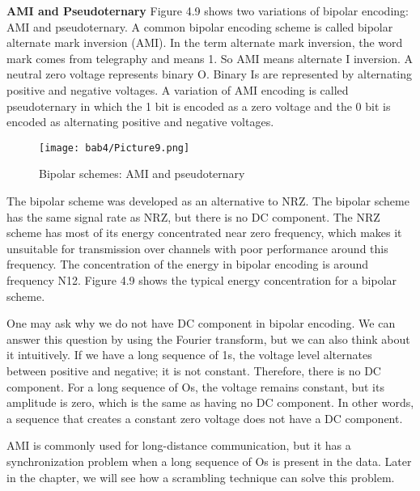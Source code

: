 \textbf{AMI and Pseudoternary} Figure 4.9 shows two variations of bipolar encoding: AMI and pseudoternary. A common bipolar encoding scheme is called bipolar alternate mark inversion (AMI). In the term alternate mark inversion, the word mark comes from telegraphy and means 1. So AMI means alternate I inversion. A neutral zero voltage represents binary O. Binary Is are represented by alternating positive and negative voltages. A variation of AMI encoding is called pseudoternary in which the 1 bit is encoded as a zero voltage and the 0 bit is encoded as alternating positive and negative voltages.

\begin{figure}
  \centering
  \texttt{[image: bab4/Picture9.png]}
  \caption{Bipolar schemes: AMI and pseudoternary}
  \label{fig4:9}
\end{figure}

The bipolar scheme was developed as an alternative to NRZ. The bipolar scheme has the same signal rate as NRZ, but there is no DC component. The NRZ scheme has most of its energy concentrated near zero frequency, which makes it unsuitable for transmission over channels with poor performance around this frequency. The concentration of the energy in bipolar encoding is around frequency N12. Figure 4.9 shows the typical energy concentration for a bipolar scheme.

One may ask why we do not have DC component in bipolar encoding. We can answer this question by using the Fourier transform, but we can also think about it intuitively. If we have a long sequence of 1s, the voltage level alternates between positive and negative; it is not constant. Therefore, there is no DC component. For a long sequence of Os, the voltage remains constant, but its amplitude is zero, which is the same as having no DC component. In other words, a sequence that creates a constant zero voltage does not have a DC component.

AMI is commonly used for long-distance communication, but it has a synchronization problem when a long sequence of Os is present in the data. Later in the chapter, we will see how a scrambling technique can solve this problem.

